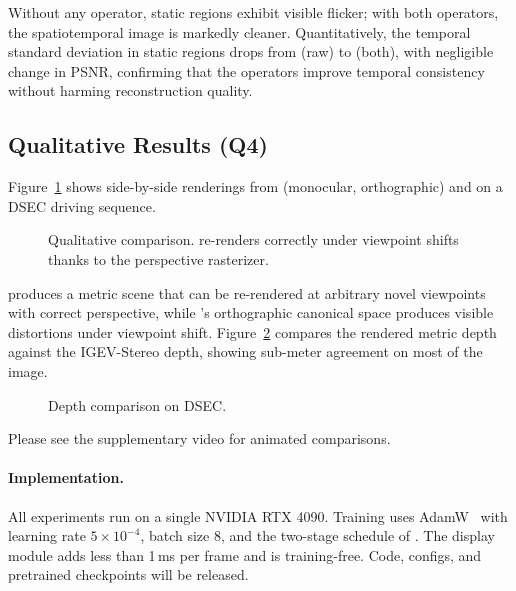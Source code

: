 Without any operator, static regions exhibit visible flicker; with both
operators, the spatiotemporal image is markedly cleaner. Quantitatively,
the temporal standard deviation in static regions drops from
 (raw) to  (both), with negligible change in PSNR,
confirming that the operators improve temporal consistency without
harming reconstruction quality.

\subsection{Qualitative Results (Q4)}

Figure~\ref{fig:qual} shows side-by-side renderings from
\StreamSplat (monocular, orthographic) and \StereoSplat on a DSEC driving
sequence.

\begin{figure}[t]
\centering
{}
\caption{Qualitative comparison. \StereoSplat re-renders correctly under
viewpoint shifts thanks to the perspective rasterizer.}
\label{fig:qual}
\end{figure}

\StereoSplat produces a metric scene that can be re-rendered at
arbitrary novel viewpoints with correct perspective, while \StreamSplat's
orthographic canonical space produces visible distortions under viewpoint
shift. Figure~\ref{fig:depth} compares the rendered metric depth against
the IGEV-Stereo depth, showing sub-meter agreement on most of the image.

\begin{figure}[t]
\centering
{}
\caption{Depth comparison on DSEC.}
\label{fig:depth}
\end{figure}

Please see the supplementary video for animated comparisons.

\paragraph{Implementation.}
All experiments run on a single NVIDIA RTX 4090. Training uses AdamW~\cite{loshchilov2019decoupled} with
learning rate $5{\times}10^{-4}$, batch size 8, and the two-stage schedule
of \StreamSplat. The display module adds less than 1\,ms per frame and is
training-free. Code, configs, and pretrained checkpoints will be released.
